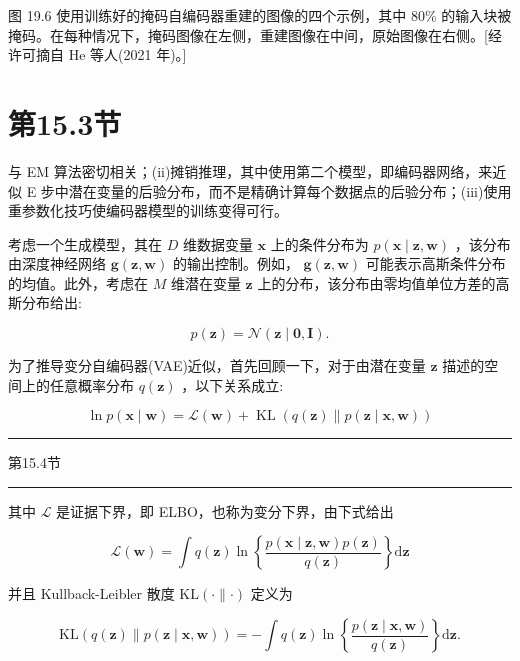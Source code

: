 \documentclass[10pt]{report}
\newcommand{\HRule}{\begin{center}\rule{0.9\linewidth}{0.2mm}\end{center}}
\begin{document}
图 19.6 使用训练好的掩码自编码器重建的图像的四个示例，其中 80\% 的输入块被掩码。在每种情况下，掩码图像在左侧，重建图像在中间，原始图像在右侧。[经许可摘自 He 等人(2021 年)。]

\section*{第15.3节}

与 EM 算法密切相关；(ii)摊销推理，其中使用第二个模型，即编码器网络，来近似 E 步中潜在变量的后验分布，而不是精确计算每个数据点的后验分布；(iii)使用重参数化技巧使编码器模型的训练变得可行。

考虑一个生成模型，其在 \(D\) 维数据变量 \(\mathbf{x}\) 上的条件分布为 \(p\left( {\mathbf{x} \mid  \mathbf{z},\mathbf{w}}\right)\) ，该分布由深度神经网络 \(\mathbf{g}\left( {\mathbf{z},\mathbf{w}}\right)\) 的输出控制。例如， \(\mathbf{g}\left( {\mathbf{z},\mathbf{w}}\right)\) 可能表示高斯条件分布的均值。此外，考虑在 \(M\) 维潜在变量 \(\mathbf{z}\) 上的分布，该分布由零均值单位方差的高斯分布给出:

\[
p\left( \mathbf{z}\right)  = \mathcal{N}\left( {\mathbf{z} \mid  \mathbf{0},\mathbf{I}}\right) . \tag{19.5}
\]

为了推导变分自编码器(VAE)近似，首先回顾一下，对于由潜在变量 \(\mathbf{z}\) 描述的空间上的任意概率分布 \(q\left( \mathbf{z}\right)\) ，以下关系成立:

\[
\ln p\left( {\mathbf{x} \mid  \mathbf{w}}\right)  = \mathcal{L}\left( \mathbf{w}\right)  + \operatorname{KL}\left( {q\left( \mathbf{z}\right) \parallel p\left( {\mathbf{z} \mid  \mathbf{x},\mathbf{w}}\right) }\right)  \tag{19.6}
\]

\HRule

第15.4节

\HRule

其中 \(\mathcal{L}\) 是证据下界，即 ELBO，也称为变分下界，由下式给出

\[
\mathcal{L}\left( \mathbf{w}\right)  = \int q\left( \mathbf{z}\right) \ln \left\{  \frac{p\left( {\mathbf{x} \mid  \mathbf{z},\mathbf{w}}\right) p\left( \mathbf{z}\right) }{q\left( \mathbf{z}\right) }\right\}  \mathrm{d}\mathbf{z} \tag{19.7}
\]

并且 Kullback-Leibler 散度 \(\mathrm{{KL}}\left( {\cdot \parallel  \cdot  }\right)\) 定义为

\[
\mathrm{{KL}}\left( {q\left( \mathbf{z}\right) \parallel p\left( {\mathbf{z} \mid  \mathbf{x},\mathbf{w}}\right) }\right)  =  - \int q\left( \mathbf{z}\right) \ln \left\{  \frac{p\left( {\mathbf{z} \mid  \mathbf{x},\mathbf{w}}\right) }{q\left( \mathbf{z}\right) }\right\}  \mathrm{d}\mathbf{z}. \tag{19.8}
\]
\end{document}
